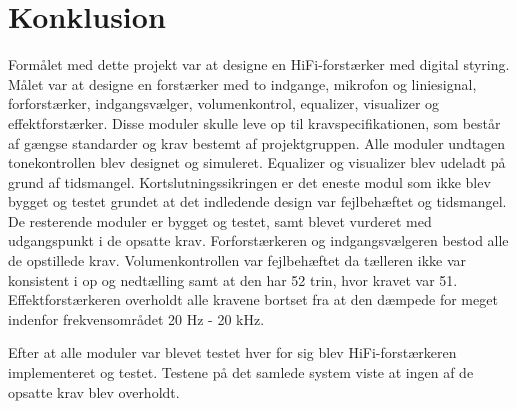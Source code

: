 \chapter{Konklusion}
\label{konklusion}

Formålet med dette projekt var at designe en HiFi-forstærker med digital styring. Målet var at designe en forstærker med to indgange, mikrofon og liniesignal, forforstærker, indgangsvælger, volumenkontrol, equalizer, visualizer og effektforstærker. Disse moduler skulle leve op til kravspecifikationen, som består af gængse standarder og krav bestemt af projektgruppen. 
Alle moduler undtagen tonekontrollen blev designet og simuleret. Equalizer og visualizer blev udeladt på grund af tidsmangel. Kortslutningssikringen er det eneste modul som ikke blev bygget og testet grundet at det indledende design var fejlbehæftet og tidsmangel. De resterende moduler er bygget og testet, samt blevet vurderet med udgangspunkt i de opsatte krav. 
Forforstærkeren og indgangsvælgeren bestod alle de opstillede krav. Volumenkontrollen var fejlbehæftet da tælleren ikke var konsistent i op og nedtælling samt at den har 52 trin, hvor kravet var 51. 
Effektforstærkeren overholdt alle kravene bortset fra at den dæmpede for meget indenfor frekvensområdet 20 Hz - 20 kHz. 

Efter at alle moduler var blevet testet hver for sig blev HiFi-forstærkeren implementeret og testet. Testene på det samlede system viste at ingen af de opsatte krav blev overholdt. 